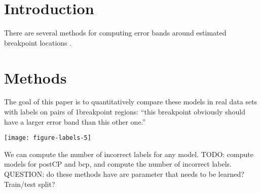 \documentclass{article}
\begin{document}
\section{Introduction}

There are several methods for computing error bands around estimated
breakpoint locations \citep{Rigaill,Luong}.

\section{Methods}

The goal of this paper is to quantitatively compare these models in
real data sets with labels on pairs of 1breakpoint regions: ``this
breakpoint obviously should have a larger error band than this other
one.'' 

\texttt{[image: figure-labels-5]}

We can compute the number of incorrect labels for any model. TODO:
compute models for postCP and bcp, and compute the number of incorrect
labels. QUESTION: do these methods have are parameter that needs to be
learned? Train/test split?



\end{document}
